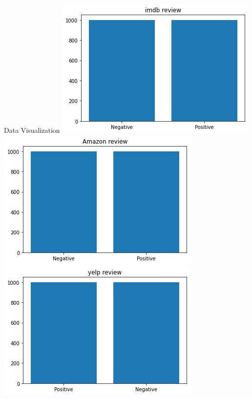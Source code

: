 \documentclass{beamer}
\begin{document}
\begin{frame}{Data Visualization}
\centering
\includegraphics[width=.4\linewidth]{Figures/imdb_review.png}\quad%
\includegraphics[width=.4\linewidth]{Figures/amazon_review.png}\quad%
\includegraphics[width=.4\linewidth]{Figures/yelp_reivew.png}
\end{frame}
\end{document}
